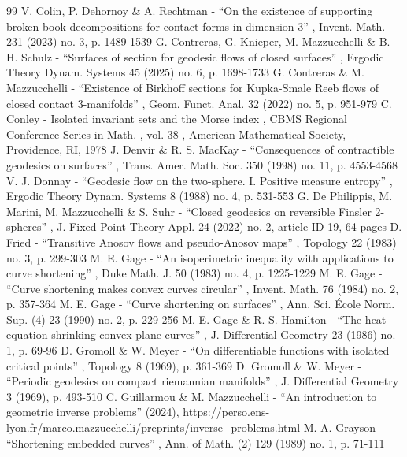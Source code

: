 \documentclass[11pt]{article}
\theoremstyle{plain}
\theoremstyle{definition}
\begin{document}
\begin{thebibliography}{99}
 V. Colin, P. Dehornoy \& A. Rechtman - “On the existence of supporting broken book decompositions for contact forms in dimension 3” , Invent. Math. 231 (2023) no. 3, p. 1489-1539
 G. Contreras, G. Knieper, M. Mazzucchelli \& B. H. Schulz - “Surfaces of section for geodesic flows of closed surfaces” , Ergodic Theory Dynam. Systems 45 (2025) no. 6, p. 1698-1733
 G. Contreras \& M. Mazzucchelli - “Existence of Birkhoff sections for Kupka-Smale Reeb flows of closed contact 3-manifolds” , Geom. Funct. Anal. 32 (2022) no. 5, p. 951-979
 C. Conley - Isolated invariant sets and the Morse index , CBMS Regional Conference Series in Math. , vol. 38 , American Mathematical Society, Providence, RI, 1978
 J. Denvir \& R. S. MacKay - “Consequences of contractible geodesics on surfaces” , Trans. Amer. Math. Soc. 350 (1998) no. 11, p. 4553-4568
 V. J. Donnay - “Geodesic flow on the two-sphere. I. Positive measure entropy” , Ergodic Theory Dynam. Systems 8 (1988) no. 4, p. 531-553
 G. De Philippis, M. Marini, M. Mazzucchelli \& S. Suhr - “Closed geodesics on reversible Finsler 2-spheres” , J. Fixed Point Theory Appl. 24 (2022) no. 2, article ID 19, 64 pages
 D. Fried - “Transitive Anosov flows and pseudo-Anosov maps” , Topology 22 (1983) no. 3, p. 299-303
 M. E. Gage - “An isoperimetric inequality with applications to curve shortening” , Duke Math. J. 50 (1983) no. 4, p. 1225-1229
 M. E. Gage - “Curve shortening makes convex curves circular” , Invent. Math. 76 (1984) no. 2, p. 357-364
 M. E. Gage - “Curve shortening on surfaces” , Ann. Sci. École Norm. Sup. (4) 23 (1990) no. 2, p. 229-256
 M. E. Gage \& R. S. Hamilton - “The heat equation shrinking convex plane curves” , J. Differential Geometry 23 (1986) no. 1, p. 69-96
 D. Gromoll \& W. Meyer - “On differentiable functions with isolated critical points” , Topology 8 (1969), p. 361-369
 D. Gromoll \& W. Meyer - “Periodic geodesics on compact riemannian manifolds” , J. Differential Geometry 3 (1969), p. 493-510
 C. Guillarmou \& M. Mazzucchelli - “An introduction to geometric inverse problems” (2024), https://perso.ens-lyon.fr/marco.mazzucchelli/preprints/inverse\_problems.html
 M. A. Grayson - “Shortening embedded curves” , Ann. of Math. (2) 129 (1989) no. 1, p. 71-111

\end{thebibliography}
\end{document}
